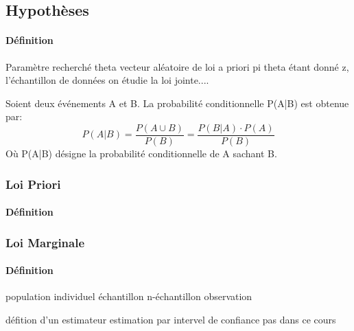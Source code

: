 \documentclass{article}
\begin{document}
\subsection{Hypothèses}
\paragraph{Définition}Paramètre recherché theta vecteur aléatoire de loi a priori pi theta étant donné z, l'échantillon de données on étudie la loi jointe....
\begin{theorem}
    Soient deux événements A et B. La probabilité conditionnelle P(A|B) est obtenue par:
    \begin{equation}
        \boxed{
            P(A|B) = \frac{P(A \cup B)}{P(B)} = \frac{P(B|A)\cdot P(A)}{P(B)}
        }
    \end{equation}
    Où P(A|B) désigne la probabilité conditionnelle de A sachant B.
\end{theorem}

\subsubsection{Loi Priori}
\paragraph{Définition}

\subsubsection{Loi Marginale}
\paragraph{Définition}






\newpage
population
individuel
échantillon
n-échantillon
observation

défition d'un estimateur
estimation par intervel de confiance pas dans ce cours
\end{document}
